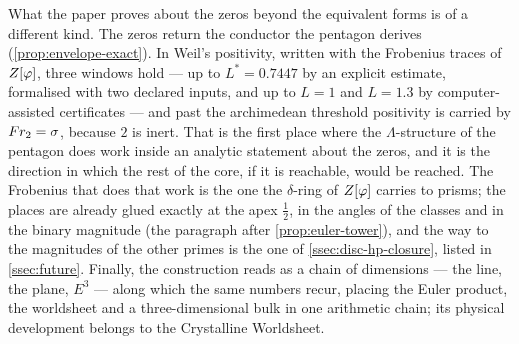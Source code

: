 What the paper proves about the zeros beyond the equivalent forms is of a different kind.
The zeros return the conductor the pentagon derives (\cref{prop:envelope-exact}).  In Weil's positivity, written
with the Frobenius traces of $Z[\varphi]$, three windows hold --- up to
$L^*=0.7447$ by an explicit estimate, formalised with two declared inputs, and up to
$L=1$ and $L=1.3$ by computer-assisted certificates --- and
past the archimedean threshold positivity is carried by $Fr_2=\sigma$, because $2$
is inert.  That is the first place where the $\Lambda$-structure of the pentagon does
work inside an analytic statement about the zeros, and it is the direction in which the rest of the core, if it is reachable, would be reached. The Frobenius that does that work is the one the $\delta$-ring of $Z[\varphi]$ carries to prisms; the places are already glued exactly at the apex $\tfrac12$, in the angles of the classes and in the binary magnitude (the paragraph after \cref{prop:euler-tower}), and the way to the magnitudes of the other primes is the one of \cref{ssec:disc-hp-closure}, listed in \cref{ssec:future}.  Finally, the construction
reads as a chain of dimensions --- the line, the plane, $E^3$ --- along which the same
numbers recur, placing the Euler product, the worldsheet and a three-dimensional bulk
in one arithmetic chain; its physical development belongs to the Crystalline Worldsheet.

